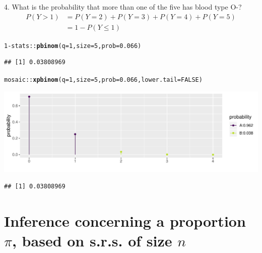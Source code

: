 \documentclass[handout]{beamer}\usepackage[]{graphicx}\usepackage[]{color}
\newcommand{\hlnum}[1]{\textcolor[rgb]{0.686,0.059,0.569}{#1}}%
\newcommand{\hlopt}[1]{\textcolor[rgb]{0,0,0}{#1}}%
\newcommand{\hlstd}[1]{\textcolor[rgb]{0.345,0.345,0.345}{#1}}%
\newcommand{\hlkwc}[1]{\textcolor[rgb]{0.333,0.667,0.333}{#1}}%
\newcommand{\hlkwd}[1]{\textcolor[rgb]{0.737,0.353,0.396}{\textbf{#1}}}%
\newenvironment{knitrout}{}{} %
\begin{document}
\begin{frame}[fragile]{4. What is the probability that more than one of the five has blood type O-?}
\footnotesize
\begin{align*}
P(Y > 1) & = P(Y = 2) + P(Y = 3) + P(Y=4) + P(Y=5) \\
& = 1 - P(Y \leq 1)
\end{align*}


\begin{knitrout}\scriptsize
{}\color{fgcolor}
\begin{alltt}
\hlnum{1} \hlopt{-} \hlstd{stats}\hlopt{::}\hlkwd{pbinom}\hlstd{(}\hlkwc{q} \hlstd{=} \hlnum{1}\hlstd{,} \hlkwc{size} \hlstd{=} \hlnum{5}\hlstd{,} \hlkwc{prob} \hlstd{=} \hlnum{0.066}\hlstd{)}
\end{alltt}
\begin{verbatim}
## [1] 0.03808969
\end{verbatim}
\begin{alltt}
\hlstd{mosaic}\hlopt{::}\hlkwd{xpbinom}\hlstd{(}\hlkwc{q} \hlstd{=} \hlnum{1}\hlstd{,} \hlkwc{size} \hlstd{=} \hlnum{5}\hlstd{,} \hlkwc{prob} \hlstd{=} \hlnum{0.066}\hlstd{,} \hlkwc{lower.tail} \hlstd{=} \hlnum{FALSE}\hlstd{)}
\end{alltt}


{\centering \includegraphics[width=1\linewidth]{figure/unnamed-chunk-11-1} 

}


\begin{verbatim}
## [1] 0.03808969
\end{verbatim}

\end{knitrout}

\end{frame}



\section{Inference concerning a proportion $\pi$, based on s.r.s. of size $n$}
\end{document}
